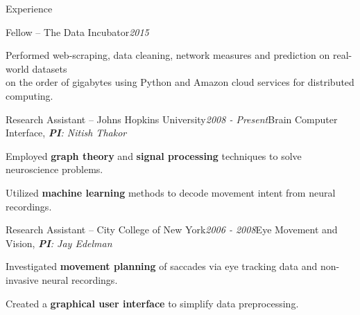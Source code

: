 \documentclass{resume} %
\begin{document}
\begin{rSection}{Experience}
	
	\begin{rSubsection}{Fellow -- The Data Incubator}{\em 2015}{}{}
		\item Performed web-scraping, data cleaning, network measures and prediction on real-world datasets \\
		on the order of gigabytes using Python and Amazon cloud services for distributed computing.
	\end{rSubsection}
	
	\begin{rSubsection}{Research Assistant -- Johns Hopkins University}{\em 2008 - Present}{Brain Computer Interface, \em{\textbf{PI}}: {Nitish Thakor}}{}
		\item Employed \textbf{graph theory} and \textbf{signal processing} techniques to solve neuroscience problems.
		\item Utilized \textbf{machine learning} methods to decode movement intent from neural recordings.
	\end{rSubsection}
	
	\begin{rSubsection}{Research Assistant -- City College of New York}{\em 2006 - 2008}{Eye Movement and Vision, \em{\textbf{PI}}: {Jay Edelman}}{}
		\item Investigated \textbf{movement planning} of saccades via eye tracking data and non-invasive neural recordings.
		\item Created a \textbf{graphical user interface} to simplify data preprocessing.
	\end{rSubsection}
	

\end{rSection}
\end{document}
